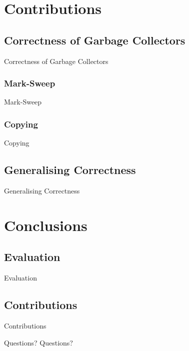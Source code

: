 \documentclass{beamer}
\begin{document}

\section{Contributions}
\subsection{Correctness of Garbage Collectors}

\begin{frame}{Correctness of Garbage Collectors}
\end{frame}

\subsubsection{Mark-Sweep}

\begin{frame}{Mark-Sweep}
\end{frame}

\subsubsection{Copying}

\begin{frame}{Copying}
\end{frame}

\subsection{Generalising Correctness}

\begin{frame}{Generalising Correctness}
\end{frame}


\section{Conclusions}
\subsection{Evaluation}

\begin{frame}{Evaluation}
\end{frame}

\subsection{Contributions}

\begin{frame}{Contributions}
\end{frame}


\begin{frame}{Questions?}
  \centering \huge Questions?
\end{frame}
\end{document}
